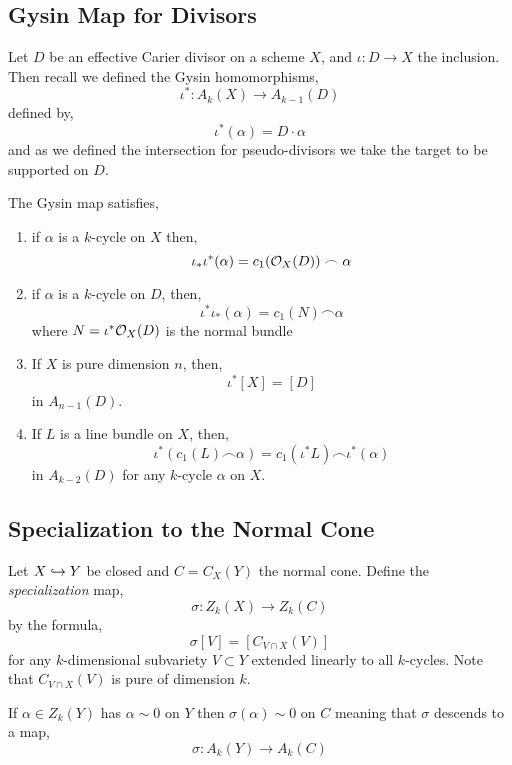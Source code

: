 \documentclass[12pt]{article}
\begin{document}
\subsection{Gysin Map for Divisors}

Let $D$ be an effective Carier divisor on a scheme $X$, and $\iota : D \to X$ the inclusion. Then recall we defined the Gysin homomorphisms,
\[ \iota^* : A_k(X) \to A_{k-1}(D) \]
defined by,
\[ \iota^*(\alpha) = D \cdot \alpha \]
and as we defined the intersection for pseudo-divisors we take the target to be supported on $D$.

\begin{prop}
The Gysin map satisfies,
\begin{enumerate}
\item if $\alpha$ is a $k$-cycle on $X$ then,
\[ \iota_* \iota^*(\alpha) = c_1(\mathcal{O}_{X}(D)) \frown \alpha \]

\item if $\alpha$ is a $k$-cycle on $D$, then,
\[ \iota^* \iota_*(\alpha) = c_1(N) \frown \alpha\] 
where $N = \iota^* \mathcal{O}_{X}(D)$ is the normal bundle

\item If $X$ is pure dimension $n$, then,
\[ \iota^* [X] = [D] \]
in $A_{n-1}(D)$.

\item If $L$ is a line bundle on $X$, then,
\[ \iota^* (c_1(L) \frown \alpha) = c_1(\iota^* L) \frown \iota^*(\alpha) \]
in $A_{k-2}(D)$ for any $k$-cycle $\alpha$ on $X$.
\end{enumerate}
\end{prop}

\subsection{Specialization to the Normal Cone}

Let $X \hookrightarrow Y$ be closed and $C = C_X(Y)$ the normal cone. Define the \textit{specialization} map,
\[ \sigma : Z_k(X) \to Z_k(C) \]
by the formula,
\[ \sigma [V] = [C_{V \cap X}(V)] \]
for any $k$-dimensional subvariety $V \subset Y$ extended linearly to all $k$-cycles. Note that $C_{V \cap X}(V)$ is pure of dimension $k$.

\begin{prop}
If $\alpha \in Z_k(Y)$ has $\alpha \sim 0$ on $Y$ then $\sigma(\alpha) \sim 0$ on $C$ meaning that $\sigma$ descends to a map,
\[ \sigma : A_k(Y) \to A_k(C) \]
\end{prop}
\end{document}
